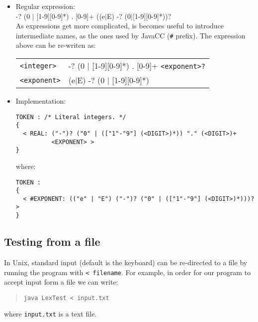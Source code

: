 \documentclass{article}
\begin{document}
\begin{itemize}
\item Regular expression:\\
 -? (0 $|$ [1-9][0-9]*) . [0-9]+ ((e$|$E) -? (0$|$[1-9][0-9]*))? \\

As expressions get more complicated, is becomes useful to introduce intermediate names, as the ones used by JavaCC (\verb+#+ prefix). The expression above can be re-writen as:\\

\begin{tabular}{ll}
\verb+<integer>+ &  -? (0 $|$ [1-9][0-9]*) . [0-9]+ \verb+<exponent>?+ \\
\verb+<exponent>+ & (e$|$E) -? (0 $|$ [1-9][0-9]*) \\
\end{tabular}

\item Implementation:
\begin{verbatim}
TOKEN : /* Literal integers. */
{
  < REAL: ("-")? ("0" | (["1"-"9"] (<DIGIT>)*)) "." (<DIGIT>)+
          <EXPONENT> >           
}
\end{verbatim}
where:
\begin{verbatim}
TOKEN : 
{
  < #EXPONENT: (("e" | "E") ("-")? ("0" | (["1"-"9"] (<DIGIT>)*)))? >
}
\end{verbatim}
\end{itemize}

\subsection*{Testing from a file}

In Unix, standard input (default is the keyboard) can be re-directed to a file by running the program with \verb+< filename+. For example, in order for our program to accept input form a file we can write:
\begin{quote}
{\tt java LexTest < input.txt}
\end{quote}
where {\tt input.txt} is a text file.
\end{document}
